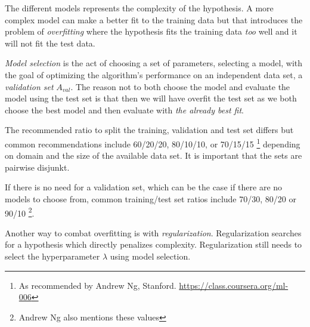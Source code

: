 The different models represents the complexity of the hypothesis. A more complex model can make a better fit to the training data but that introduces the problem of \textit{overfitting} where the hypothesis fits the training data \textit{too} well and it will not fit the test data.
\citep{norvigAI}

\textit{Model selection} is the act of choosing a set of parameters, selecting a model, with the goal of optimizing the algorithm's performance on an independent data set, a \textit{validation set} $A_{val}$.  The reason not to both choose the model and evaluate the model using the test set is that then we will have overfit the test set as we both choose the best model and then evaluate with \textit{the already best fit}. \citep{norvigAI}

The recommended ratio to split the training, validation and test set differs but common recommendations include 60/20/20, 80/10/10, or 70/15/15
\footnote{As recommended by Andrew Ng, Stanford. \url{https://class.coursera.org/ml-006}}
depending on domain and the size of the available data set. It is important that the sets are pairwise disjunkt.

If there is no need for a validation set, which can be the case if there are no models to choose from, common training/test set ratios include 70/30, 80/20 or 90/10 \cite{hu2008collaborative, norvigAI}
\footnote{Andrew Ng also mentions these values}.

Another way to combat overfitting is with \textit{regularization}. Regularization searches for a hypothesis which directly penalizes complexity.  Regularization still needs to select the hyperparameter $\lambda$ using model selection.
\citep{norvigAI}

